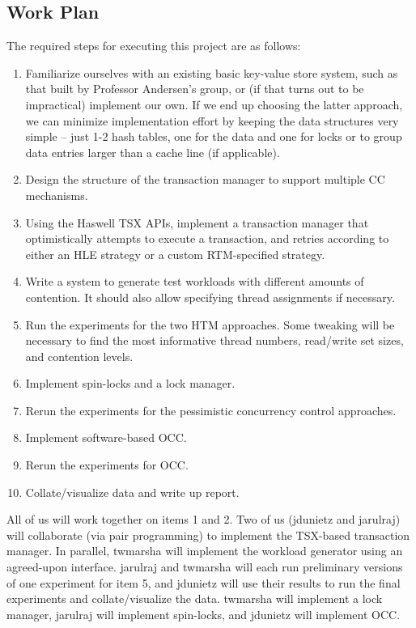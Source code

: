 \subsection{Work Plan}
The required steps for executing this project are as follows:
\begin{enumerate}
\item Familiarize ourselves with an existing basic key-value store system, such as that built by Professor Andersen's group, or (if that turns out to be impractical) implement our own. If we end up choosing the latter approach, we can minimize implementation effort by keeping the data structures very simple -- just 1-2 hash tables, one for the data and one for locks or to group data entries larger than a cache line (if applicable).
\item Design the structure of the transaction manager to support multiple CC mechanisms.
\item Using the Haswell TSX APIs, implement a transaction manager that optimistically attempts to execute a transaction, and retries according to either an HLE strategy or a custom RTM-specified strategy.
\item Write a system to generate test workloads with different amounts of contention. It should also allow specifying thread assignments if necessary.
\item Run the experiments for the two HTM approaches. Some tweaking will be necessary to find the most informative thread numbers, read/write set sizes, and contention levels.
\item Implement spin-locks and a lock manager.
\item Rerun the experiments for the pessimistic concurrency control approaches.
\item Implement software-based OCC.
\item Rerun the experiments for OCC.
\item Collate/visualize data and write up report.
\end{enumerate}

All of us will work together on items 1 and 2. Two of us (jdunietz and jarulraj) will collaborate (via pair programming) to implement the TSX-based transaction manager. In parallel, twmarsha will implement the workload generator using an agreed-upon interface. jarulraj and twmarsha will each run preliminary versions of one experiment for item 5, and jdunietz will use their results to run the final experiments and collate/visualize the data. twmarsha will implement a lock manager, jarulraj will implement spin-locks, and jdunietz will implement OCC.
